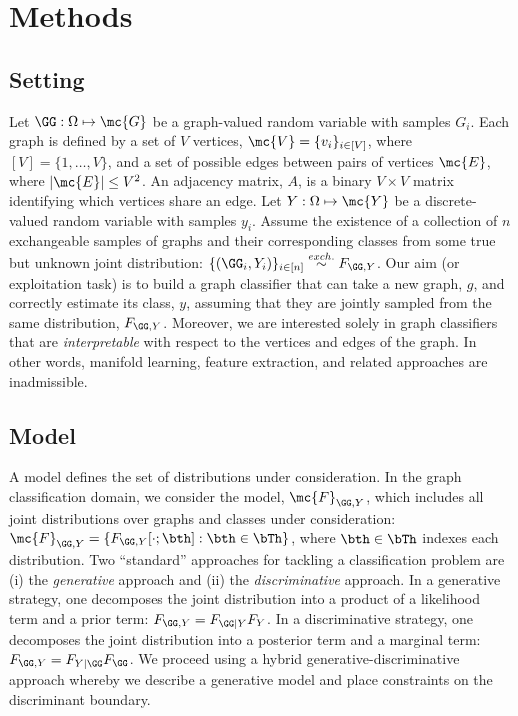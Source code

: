 \documentclass[10pt,journal,cspaper,compsoc]{IEEEtran}
\begin{document}
\section{Methods} %
\label{sec:methods}


\subsection{Setting}

Let $\GG: \Omega \mapsto \mc{G}$ be a graph-valued random variable with samples $G_i$.  Each graph is defined by a set of $V$ vertices, $\mc{V}=\{v_i\}_{i \in [V]}$, where $[V]=\{1,\ldots, V\}$, and a set of possible edges between pairs of vertices $\mc{E}$, where $|\mc{E}| \leq V^2$. An adjacency matrix, $A$, is a binary $V \times V$ matrix identifying which vertices share an edge. Let $Y:\Omega \mapsto \mc{Y}$ be a discrete-valued random variable with samples $y_i$.  Assume the existence of a collection of $n$ exchangeable samples of graphs and their corresponding classes from some true but unknown joint distribution: $\{(\GG_i,Y_i)\}_{i \in [n]} \overset{exch.}{\sim} F_{\GG,Y}$. Our aim (or exploitation task) is to build a graph classifier that can take a new graph, $g$, and correctly estimate its class, $y$, assuming that they are jointly sampled from the same distribution, $F_{\GG,Y}$.  Moreover, we are interested solely in graph classifiers that are \emph{interpretable} with respect to the vertices and edges of the graph. In other words, manifold learning, feature extraction, and related approaches are inadmissible.  

\subsection{Model} %
\label{sub:model}

A model defines the set of distributions under consideration.  In the graph classification domain, we consider the model, $\mc{F}_{\GG,Y}$, which includes all joint distributions over graphs and classes under consideration: $\mc{F}_{\GG,Y}=\{F_{\GG, Y}[\cdot; \bth] : \bth \in \bTh\}$, where $\bth \in \bTh$ indexes each distribution.  Two ``standard'' approaches for tackling a classification problem are (i) the \emph{generative} approach and (ii) the \emph{discriminative} approach.  In a generative strategy, one decomposes the joint distribution into a product of a likelihood term and a prior term:  $F_{\GG,Y}=F_{\GG | Y}F_Y$.  In a discriminative strategy, one decomposes the joint distribution into a posterior term and a marginal term: $F_{\GG,Y}=F_{Y | \GG}F_{\GG}$.  We proceed using a hybrid generative-discriminative approach whereby we describe a generative model and place constraints on the discriminant boundary.
\end{document}
